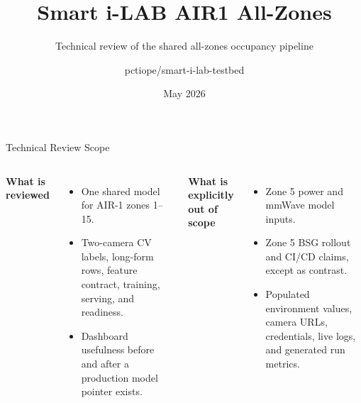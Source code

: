 \documentclass[aspectratio=169]{beamer}
\title{Smart i-LAB AIR1 All-Zones}
\subtitle{Technical review of the shared all-zones occupancy pipeline}
\author{pctiope/smart-i-lab-testbed}
\date{May 2026}
\begin{document}

\begin{frame}[shrink=4]{Technical Review Scope}
\begin{columns}[T,onlytextwidth]
\textbf{What is reviewed}
\begin{itemize}
  \item One shared model for AIR-1 zones 1--15.
  \item Two-camera CV labels, long-form rows, feature contract, training, serving, and readiness.
  \item Dashboard usefulness before and after a production model pointer exists.
\end{itemize}

\textbf{What is explicitly out of scope}
\begin{itemize}
  \item Zone 5 power and mmWave model inputs.
  \item Zone 5 BSG rollout and CI/CD claims, except as contrast.
  \item Populated environment values, camera URLs, credentials, live logs, and generated run metrics.
\end{itemize}
\end{columns}
\tightsep
\begin{center}
\hspace{0.4em}
\hspace{0.4em}
\hspace{0.4em}
\end{center}
\end{frame}
\end{document}
